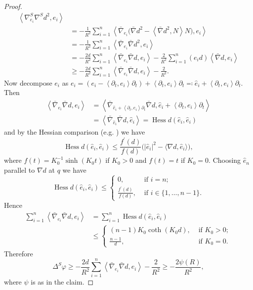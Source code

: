 \documentclass[10pt,a4paper,reqno]{amsart}
\newcommand{\ang}[1]{\left\langle #1 \right\rangle}
\newcommand{\p}{\partial}
\DeclareMathOperator\Hess{Hess}
\numberwithin{equation}{section}
\theoremstyle{plain}
\theoremstyle{definition}
\begin{document}
\begin{proof}
\begin{align*}
	\ang{\nabla^S_{e_i}\nabla^S d^2,e_i} \\
	&= - \frac{1}{R^2} \sum_{i=1}^n \ang{\bar\nabla_{e_i}\bigl(\bar\nabla d^2-\ang{\bar\nabla d^2,N}N\bigr),e_i} \\
	&= - \frac{1}{R^2} \sum_{i=1}^n \ang{\bar\nabla_{e_i}\bar\nabla d^2,e_i} \\
	&= - \frac{2d}{R^2} \sum_{i=1}^n \ang{\bar\nabla_{e_i}\bar\nabla d,e_i}
	- \frac{2}{R^2} \sum_{i=1}^n (e_i d)\ang{\bar\nabla d,e_i} \\
	&\ge - \frac{2d}{R^2} \sum_{i=1}^n \ang{\bar\nabla_{e_i}\bar\nabla d,e_i} -\frac{2}{R^2}.
	\end{align*}
Now decompose $e_i$ as $e_i = (e_i - \ang{\p_t,e_i}\p_t) + \ang{\p_t,e_i}\p_t \eqqcolon \hat{e}_i + \ang{\p_t,e_i}\p_t.$ 	
Then
	\begin{align*}
	\ang{\bar\nabla_{e_i}\bar\nabla d,e_i} &= \ang{\bar\nabla_{\hat e_i 
		+ \ang{\p_t,e_i}\p_t}\bar\nabla d,\hat e_i + \ang{\p_t,e_i}\p_t} \\
	&= \ang{\bar\nabla_{\hat e_i}\bar\nabla d,\hat e_i} 
	= \Hess d(\hat e_i, \hat e_i)
	\end{align*}
and by the Hessian comparison (e.g. \cite[Theorem A]{GW}) we have
\[
\Hess d (\hat{e}_i,\hat {e}_i)\le \frac {f^\prime(d)}{f (d)}\bigl( |\hat {e}_i|^2-\langle\nabla d,\hat{e}_i\rangle\bigr),
\]
where $f(t)=K_0^{-1}\sinh (K_0 t) $ if $K_0>0$ and $f (t)=t $ if $K_0=0$. Choosing $\hat{e}_n $ parallel to 
$\nabla d $ at $q $ we have
\[
\Hess d (\hat e_i,\hat e_i)\le
\begin{cases}
0, &\text{ if }i=n;\\
\frac{f^\prime(d)}{f(d)}, &\text{ if }i\in\{1,\ldots,n-1\}.
\end{cases}
\]
Hence
\begin{align*}
\sum_{i=1}^n \ang{\bar\nabla_{e_i}\bar\nabla d,e_i} & =\sum_{i=1}^n \Hess d(\hat e_i, \hat e_i)\\
&
\le\begin{cases}
(n-1)K_0\coth(K_0 d), &\text{ if } K_0>0;\\
\frac{n-1}{d}, &\text{ if } K_0=0.
\end{cases}
\end{align*}
Therefore
\begin{equation}\label{comparison}
\Delta^S \varphi\ge - \frac{2d}{R^2} \sum_{i=1}^n \ang{\bar\nabla_{e_i}\bar\nabla d,e_i}-\frac{2}{R^2}
 \ge -\frac{2 \psi(R)}{R^2},
\end{equation}	
where $\psi$ is as in the claim.


\end{proof}
\end{document}
